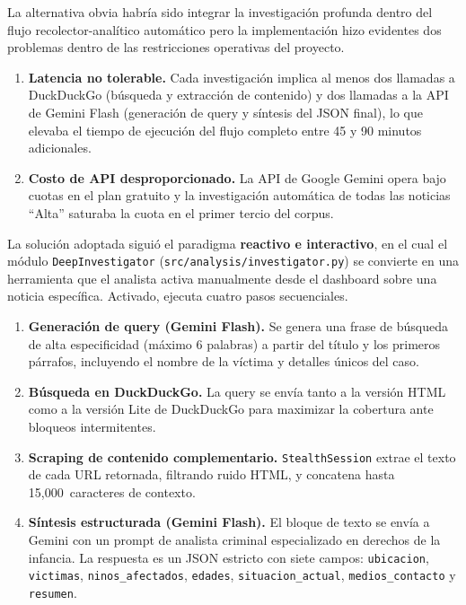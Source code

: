 La alternativa obvia habría sido integrar la investigación profunda dentro del flujo
recolector-analítico automático pero la implementación hizo evidentes dos problemas
dentro de las restricciones operativas del proyecto.

\begin{enumerate}
    \item \textbf{Latencia no tolerable.} Cada investigación implica al menos dos llamadas a
          DuckDuckGo (búsqueda y extracción de contenido) y dos llamadas a la API de Gemini
          Flash (generación de query y síntesis del JSON final), lo que elevaba el tiempo
          de ejecución del flujo completo entre 45 y 90 minutos adicionales.
    \item \textbf{Costo de API desproporcionado.} La API de Google Gemini opera bajo cuotas
          en el plan gratuito y la investigación automática de todas las noticias ``Alta''
          saturaba la cuota en el primer tercio del corpus.
\end{enumerate}

La solución adoptada siguió el paradigma \textbf{reactivo e interactivo}, en el cual el módulo
\texttt{DeepInvestigator} (\texttt{src/analysis/investigator.py}) se convierte en una
herramienta que el analista activa manualmente desde el dashboard sobre una noticia
específica. Activado, ejecuta cuatro pasos secuenciales.

\begin{enumerate}
    \item \textbf{Generación de query (Gemini Flash).} Se genera una frase de búsqueda
          de alta especificidad (máximo 6 palabras) a partir del título y los primeros párrafos,
          incluyendo el nombre de la víctima y detalles únicos del caso.
    \item \textbf{Búsqueda en DuckDuckGo.} La query se envía tanto a la versión HTML como a la
          versión Lite de DuckDuckGo para maximizar la cobertura ante bloqueos intermitentes.
    \item \textbf{Scraping de contenido complementario.} \texttt{StealthSession} extrae el texto
          de cada URL retornada, filtrando ruido HTML, y concatena hasta 15{,}000~caracteres
          de contexto.
    \item \textbf{Síntesis estructurada (Gemini Flash).} El bloque de texto se envía a Gemini
          con un prompt de analista criminal especializado en derechos de la infancia. La respuesta
          es un JSON estricto con siete campos: \texttt{ubicacion}, \texttt{victimas},
          \texttt{ninos\_afectados}, \texttt{edades}, \texttt{situacion\_actual},
          \texttt{medios\_contacto} y \texttt{resumen}.
\end{enumerate}


